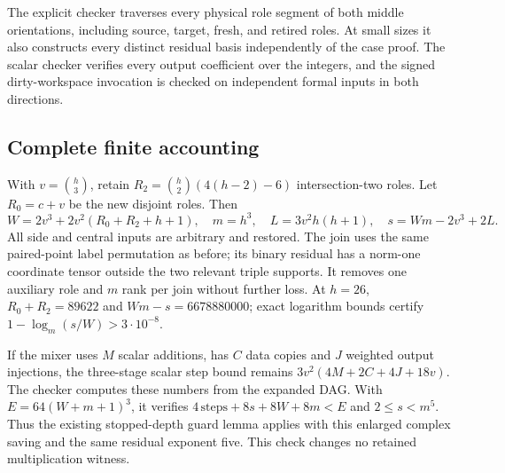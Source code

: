 The explicit checker traverses every physical role segment of both middle
orientations, including source, target, fresh, and retired roles. At small
sizes it also constructs every distinct residual basis independently of
the case proof. The scalar checker verifies every output coefficient over
the integers, and the signed dirty-workspace invocation is checked on
independent formal inputs in both directions.

\subsection{Complete finite accounting}
With $v=\binom h3$, retain $R_2=\binom h2(4(h-2)-6)$ intersection-two roles.
Let $R_0=c+v$ be the new disjoint roles. Then
\[
 W=2v^3+2v^2(R_0+R_2+h+1),\quad m=h^3,\quad
 L=3v^2h(h+1),\quad s=Wm-2v^3+2L.
\]
All side and central inputs are arbitrary and restored. The join uses the
same paired-point label permutation as before; its binary residual has a
norm-one coordinate tensor outside the two relevant triple supports.
It removes one auxiliary role and $m$ rank per join without further loss.
At $h=26$, $R_0+R_2=89622$ and $Wm-s=6678880000$; exact logarithm bounds
certify $1-\log_m(s/W)>3\cdot10^{-8}$.

If the mixer uses $M$ scalar additions, has $C$ data copies and $J$ weighted
output injections, the three-stage scalar step bound remains
$3v^2(4M+2C+4J+18v)$. The checker computes these numbers from the expanded
DAG. With $E=64(W+m+1)^3$, it verifies
$4\,\mathrm{steps}+8s+8W+8m<E$ and $2\le s<m^5$.
Thus the existing stopped-depth guard lemma applies with this enlarged
complex saving and the same residual exponent five. This check changes no
retained multiplication witness.
